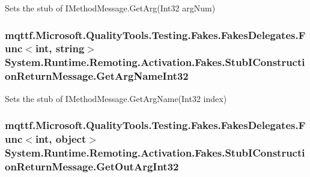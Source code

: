 Sets the stub of I\-Method\-Message.\-Get\-Arg(\-Int32 arg\-Num)

\hypertarget{class_system_1_1_runtime_1_1_remoting_1_1_activation_1_1_fakes_1_1_stub_i_construction_return_message_a8837b775e4966348e20c7c2ab901d027}{
\subsubsection[{Get\-Arg\-Name\-Int32}]{\setlength{\rightskip}{0pt plus 5cm}mqttf.\-Microsoft.\-Quality\-Tools.\-Testing.\-Fakes.\-Fakes\-Delegates.\-Func$<$int, string$>$ System.\-Runtime.\-Remoting.\-Activation.\-Fakes.\-Stub\-I\-Construction\-Return\-Message.\-Get\-Arg\-Name\-Int32}}\label{class_system_1_1_runtime_1_1_remoting_1_1_activation_1_1_fakes_1_1_stub_i_construction_return_message_a8837b775e4966348e20c7c2ab901d027}


Sets the stub of I\-Method\-Message.\-Get\-Arg\-Name(\-Int32 index)

\hypertarget{class_system_1_1_runtime_1_1_remoting_1_1_activation_1_1_fakes_1_1_stub_i_construction_return_message_aef101e1d177e9e77d112b6a18de32393}{
\subsubsection[{Get\-Out\-Arg\-Int32}]{\setlength{\rightskip}{0pt plus 5cm}mqttf.\-Microsoft.\-Quality\-Tools.\-Testing.\-Fakes.\-Fakes\-Delegates.\-Func$<$int, object$>$ System.\-Runtime.\-Remoting.\-Activation.\-Fakes.\-Stub\-I\-Construction\-Return\-Message.\-Get\-Out\-Arg\-Int32}}\label{class_system_1_1_runtime_1_1_remoting_1_1_activation_1_1_fakes_1_1_stub_i_construction_return_message_aef101e1d177e9e77d112b6a18de32393}


